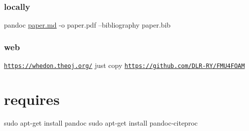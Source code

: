 \subsubsection*{locally}

pandoc \hyperlink{paper_8md}{paper.\+md} -\/o paper.\+pdf --bibliography paper.\+bib

\subsubsection*{web}

\href{https://whedon.theoj.org/}{\tt https\+://whedon.\+theoj.\+org/} just copy \href{https://github.com/DLR-RY/FMU4FOAM}{\tt https\+://github.\+com/\+D\+L\+R-\/\+R\+Y/\+F\+M\+U4\+F\+O\+AM}

\section*{requires}

sudo apt-\/get install pandoc sudo apt-\/get install pandoc-\/citeproc 